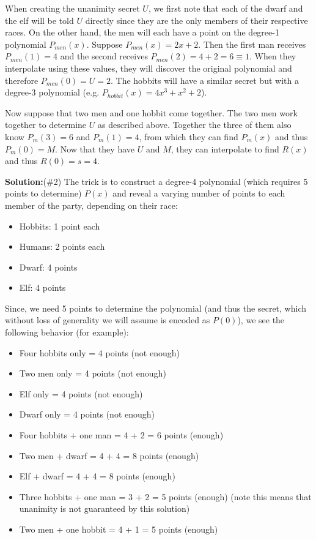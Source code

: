 \documentclass[]{article}
\renewcommand{\answer}[1]{{\color{mydarkblue}\textbf{Solution:}#1}}
\begin{document}
\begin{qunlist}
{{When creating the unanimity secret $U$, we first note that each of the dwarf and the elf will be told $U$ directly since they are the only members of their respective races. On the other hand, the men will each have a point on the degree-1 polynomial $P_{men}(x)$. Suppose $P_{men}(x) = 2x+2$. Then the first man receives $P_{men}(1) = 4$ and the second receives $P_{men}(2) = 4+2 = 6 \equiv 1$. When they interpolate using these values, they will discover the original polynomial and therefore $P_{men}(0) = U = 2$. The hobbits will have a similar secret but with a degree-3 polynomial (e.g. $P_{hobbit}(x) = 4x^3 + x^2 + 2$).

Now suppose that two men and one hobbit come together. The two men work together to determine $U$ as described above. Together the three of them also know $P_m(3)=6$ and $P_m(1)=4$, from which they can find $P_m(x)$ and thus $P_m(0) = M$. Now that they have $U$ and $M$, they can interpolate to find $R(x)$ and thus $R(0) = s = 4$.




\answer (\#2) The trick is to construct a degree-4 polynomial (which requires 5 points to determine) $P(x)$ and reveal a varying number of points to each member of the party, depending on their race:

\begin{itemize}
	\item Hobbits: 1 point each
	\item Humans: 2 points each
	\item Dwarf: 4 points
	\item Elf: 4 points
\end{itemize}

Since, we need 5 points to determine the polynomial (and thus the secret, which without loss of generality we will assume is encoded as $P(0)$), we see the following behavior (for example):
\begin{itemize}
	\item Four hobbits only = 4 points (not enough)
	\item Two men only = 4 points (not enough)
	\item Elf only = 4 points (not enough)
	\item Dwarf only = 4 points (not enough)
	\item Four hobbits + one man = 4 + 2 = 6 points (enough)
	\item Two men + dwarf = 4 + 4 = 8 points (enough)
	\item Elf + dwarf = 4 + 4 = 8 points (enough)
	\item Three hobbits + one man = 3 + 2 = 5 points (enough) (note this means that unanimity is not guaranteed by this solution)
	\item Two men + one hobbit = 4 + 1 = 5 points (enough)
\end{itemize}

}}
\end{qunlist}
\end{document}
